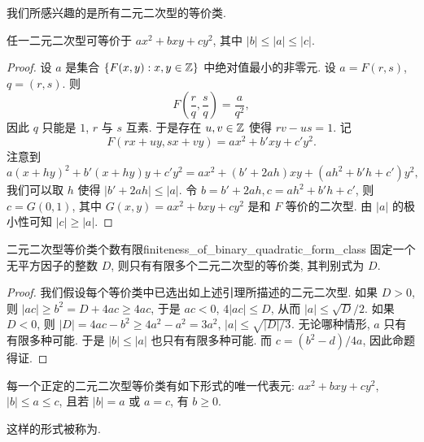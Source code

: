 我们所感兴趣的是所有二元二次型的等价类.

\begin{lemma}{}{}
任一二元二次型可等价于 $ax^2+bxy+cy^2$, 其中 $|b|\le|a|\le |c|$.
\end{lemma}
\begin{proof}
设 $a$ 是集合 $\left\{F(x,y):x,y\in{\mathbb{Z}}\right\}$ 中绝对值最小的非零元. 设 $a=F(r,s)$, $q=(r,s)$. 则
\[F\left(\frac rq,\frac sq\right)=\frac a{q^2},\]
因此 $q$ 只能是 $1$, $r$ 与 $s$ 互素. 于是存在 $u,v\in{\mathbb{Z}}$ 使得 $rv-us=1$. 记
	\[F(rx+uy,sx+vy)=ax^2+b'xy+c' y^2.\]
注意到
	\[a(x+hy)^2+b'(x+hy)y+c'y^2=ax^2+(b'+2ah)xy+(ah^2+b'h+c')y^2,\]
我们可以取 $h$ 使得 $|b'+2ah|\le|a|$. 令 $b=b'+2ah,c=ah^2+b'h+c'$, 则 $c=G(0,1)$, 其中 $G(x,y)=ax^2+bxy+cy^2$ 是和 $F$ 等价的二次型. 由 $|a|$ 的极小性可知 $|c|\ge|a|$.
\end{proof}

\begin{theorem}{二元二次型等价类个数有限}{finiteness_of_binary_quadratic_form_class}
固定一个无平方因子的整数 $D$, 则只有有限多个二元二次型的等价类, 其判别式为 $D$.
\end{theorem}
\begin{proof}
我们假设每个等价类中已选出如上述引理所描述的二元二次型. 如果 $D>0$, 则 $|ac|\ge b^2=D+4ac\ge 4ac$, 于是 $ac<0$, $4|ac|\le D$, 从而 $|a|\le\sqrt{D}/2$. 如果 $D<0$, 则 $|D|=4ac-b^2\ge 4a^2-a^2=3a^2$, $|a|\le\sqrt{|D|/3}$.
无论哪种情形, $a$ 只有有限多种可能. 于是 $|b|\le|a|$ 也只有有限多种可能. 而 $c=(b^2-d)/4a$, 因此命题得证.
\end{proof}

\begin{theorem}{}{}
每一个正定的二元二次型等价类有如下形式的唯一代表元: $ax^2+bxy+cy^2$, $|b|\le a\le c$, 且若 $|b|=a$ 或 $a=c$, 有 $b\ge 0$.
\end{theorem}
\begin{remark}
这样的形式被称为.
\end{remark}

